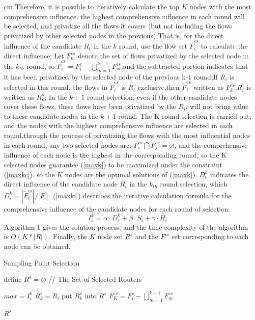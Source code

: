 \documentclass[conference]{IEEEtran}
\begin{document}
 cm
Therefore, it is possible to iteratively calculate the top $K$ nodes with the most comprehensive influence, the highest comprehensive influence in each round will be selected, and privatize all the flows it covers (but not including the flows privatized by other selected nodes in the previous);That is, for the direct influence of the candidate $R_i$ in the $k$ round, use the flow set $\widetilde{F}^{cs}_i$ to calculate the direct influence; Let $F_k^{cs}$ denote the set of flows privatized by the selected node in the $k_{th}$ round, so $\widetilde{F}^{cs}_i = F_i^c- \bigcup_{m=1}^{k-1}F_m^{cs}$,and the subtracted portion indicates that it has been privatized by the selected node of the previous k-1 round;If $R_i$ is selected in this round, the flows in $\widetilde{F}^{cs}_i$ is $R_i$ exclusive,then $\widetilde{F}^{cs}_i$ written as $F^{cs}_k$,$R_i$ is written as $R^s_k$; In the $k+1$ round selection, even if the other candidate nodes cover these flows, these flows have been privatized by the $R_i$, will not bring value to these candidate nodes in the $k+1$ round. The K-round selection is carried out, and the nodes with the highest comprehensive influence are selected in each round,through the process of privatizing the flows with the most influential nodes in each round, any two selected nodes are: $F^{cs}_i \bigcap F^{cs}_j = \varnothing$, and the comprehensive influence of each node is the highest in the corresponding round, so the K selected nodes guarantee (\ref{maxk}) to be maximized under the constraint (\ref{maxkc}). so the $K$ nodes are the optimal solutions of (\ref{maxk}). $D_i^k$ indicates the direct influence of the candidate node $R_i$ in the $k_{th}$ round selection, which $D_i^k = |\widetilde{F}^{cs}_i|/{\left| F^c \right|}$. (\ref{maxki}) describes the iterative calculation formula for the comprehensive influence of the candidate nodes for each round of selection.
\begin{equation}
I_{i}^{k}=\alpha \cdot D_{i}^{k}+\beta \cdot {{S}_{i}}+\gamma \cdot {{H}_{i}}
\label{maxki}
\end{equation}
Algorithm 1 gives the solution process, and the time complexity of the algorithm is $O(K*|R|)$. %
 Finally, the $K$ node set $R^s$ and the $F^{cs}$ set corresponding to each node can be obtained.


\begin{algorithm}[h]
\caption{Sampling Point Selection}
\begin{algorithmic}[1]

\STATE define $R^s=\varnothing$  //  The Set of Selected Routers


\STATE $max = I_i^k$
\STATE $R^s_k = R_i$
\ENDIF
\ENDFOR
\STATE put $R^s_k$ into $R^s$
\STATE $F_K^{cs} = F_i^c- \bigcup_{m=1}^{k-1}F_m^{cs}$ 
\ENDFOR

\RETURN $R^s$
\label{code:recentEnd}
\end{algorithmic}
\end{algorithm}
\end{document}
